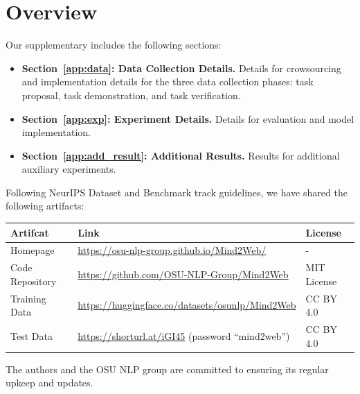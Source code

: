\section{Overview}

Our supplementary includes the following sections:
\begin{itemize}
    \item \textbf{Section~\ref{app:data}: Data Collection Details.} Details for crowsourcing and implementation details for the three data collection phases: task proposal, task demonstration, and task verification.
    \item \textbf{Section~\ref{app:exp}: Experiment Details.} Details for evaluation and model implementation.
    \item \textbf{Section~\ref{app:add_result}: Additional Results.} Results for additional auxiliary experiments.
\end{itemize}

Following NeurIPS Dataset and Benchmark track guidelines, we have shared the following artifacts:

\begin{table}[h]
    \centering
    \begin{tabular}{lll}
    \toprule
    \textbf{Artifcat}     &  \textbf{Link} & \textbf{License}\\
    \midrule
      Homepage   & \url{https://osu-nlp-group.github.io/Mind2Web/} &-\\\addlinespace
      Code Repository & \url{https://github.com/OSU-NLP-Group/Mind2Web} & MIT License\\\addlinespace
      Training Data & \url{https://huggingface.co/datasets/osunlp/Mind2Web} & CC BY 4.0\\\addlinespace
      Test Data & \url{https://shorturl.at/iGI45} (password ``mind2web'') & CC BY 4.0\\
         \bottomrule
    \end{tabular}
    \label{tab:artifact_link}
\end{table}

The authors and the OSU NLP group are committed to ensuring its regular upkeep and updates.

\newpage